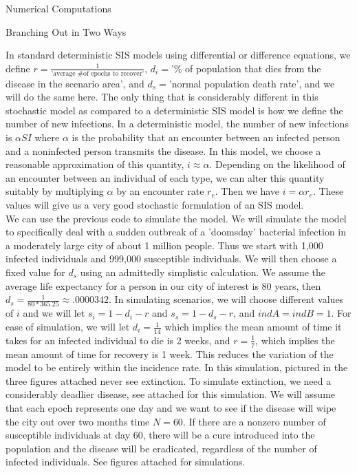 \documentclass[12pt]{article}
\numberwithin{equation}{section}
\begin{document}
\begin{section}{Numerical Computations}
\begin{subsection}{Branching Out in Two Ways}
\begin{enumerate}
        In standard deterministic SIS models using differential or difference equations, we define $r=\frac{1}{\text{'average \# of epochs to recover'}}$, $d_i=$'\% of population that dies from the disease in the scenario area', and $d_s=$'normal population death rate', and we will do the same here. The only thing that is considerably different in this stochastic model as compared to a deterministic SIS model is how we define the number of new infections. In a deterministic model, the number of new infections is $\alpha SI$ where $\alpha$ is the probability that an encounter between an infected person and a noninfected person transmits the disease. In this model, we choose a reasonable approximation of this quantity, $i\approx \alpha$. Depending on the likelihood of an encounter between an individual of each type, we can alter this quantity suitably by multiplying $\alpha$ by an encounter rate $r_e$. Then we have $i=\alpha r_e$. These values will give us a very good stochastic formulation of an SIS model. \\
        We can use the previous code to simulate the model. We will simulate the model to specifically deal with a sudden outbreak of a 'doomsday' bacterial infection in a moderately large city of about 1 million people. Thus we start with 1,000 infected individuals and 999,000 susceptible individuals. We will then choose a fixed value for $d_s$ using an admittedly simplistic calculation. We assume the average life expectancy for a person in our city of interest is 80 years, then $d_s=\frac{1}{80*365.25}\approx.0000342$. In simulating scenarios, we will choose different values of $i$ and we will let $s_i=1-d_i-r$ and $s_s=1-d_s-r$, and $indA=indB=1$. For ease of simulation, we will let $d_i=\frac{1}{14}$ which implies the mean amount of time it takes for an infected individual to die is 2 weeks, and $r=\frac{1}{7}$, which implies the mean amount of time for recovery is 1 week. This reduces the variation of the model to be entirely within the incidence rate. In this simulation, pictured in the three figures attached never see extinction. To simulate extinction, we need a considerably deadlier disease, see attached for this simulation. We will assume that each epoch represents one day and we want to see if the disease will wipe the city out over two months time $N=60$. If there are a nonzero number of susceptible individuals at day 60, there will be a cure introduced into the population and the disease will be eradicated, regardless of the number of infected individuals. See figures attached for simulations.


\end{enumerate}
\end{subsection}
\end{section}
\end{document}

